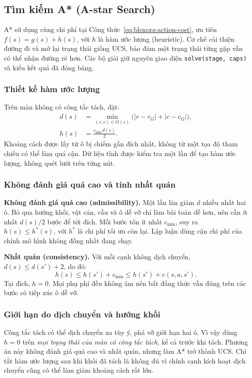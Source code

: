 \subsection{Tìm kiếm A* (A-star Search)}
\label{sec:bloxorz-astar}

A* sử dụng cùng chi phí tại Công thức~\eqref{eq:bloxorz-action-cost}, ưu tiên
$f(s)=g(s)+h(s)$, với $h$ là hàm ước lượng (heuristic). Cơ chế cải thiện đường
đi và mở lại trạng thái giống UCS, bảo đảm một trạng thái từng gặp vẫn có thể
nhận đường rẻ hơn. Các bộ giải giữ nguyên giao diện
\texttt{solve(stage, caps)} và kiểu kết quả đã đóng băng.

\subsubsection{Thiết kế hàm ước lượng}
Trên màn không có công tắc tách, đặt:
\begin{align}
  d(s)&=\min_{(r,c)\in O(s)}\bigl(|r-r_G|+|c-c_G|\bigr),\\
  h(s)&=\frac{c_{\min}\,d(s)}{2}.
  \label{eq:bloxorz-heuristic}
\end{align}
Khoảng cách được lấy từ ô bị chiếm gần đích nhất, không từ một tọa độ tham
chiếu có thể làm quá cận. Dữ liệu tĩnh được kiểm tra một lần để tạo hàm ước
lượng, không quét lưới trên từng nút.

\subsubsection{Không đánh giá quá cao và tính nhất quán}
\textbf{Không đánh giá quá cao (admissibility).}
Một lần lăn giảm $d$ nhiều nhất hai ô. Bỏ qua hướng khối, vật cản, cầu và ô dễ
vỡ chỉ làm bài toán dễ hơn, nên cần ít nhất $d(s)/2$ bước để tới đích. Mỗi bước
tốn ít nhất $c_{\min}$, suy ra $h(s)\leq h^*(s)$, với $h^*$ là chi phí tối ưu
còn lại. Lập luận dùng cận chi phí của chính mô hình không đồng nhất đang chạy.

\textbf{Nhất quán (consistency).}
Với mỗi cạnh không dịch chuyển, $d(s)\leq d(s')+2$, do đó:
\begin{equation}
  h(s)\leq h(s')+c_{\min}\leq h(s')+c(s,a,s').
\end{equation}
Tại đích, $h=0$. Mọi phụ phí đều không âm nên bất đẳng thức vẫn đúng trên
các bước có tiếp xúc ô dễ vỡ.

\subsubsection{Giới hạn do dịch chuyển và hướng khối}
Công tắc tách có thể dịch chuyển xa tùy ý, phá vỡ giới hạn hai ô. Vì vậy dùng
$h=0$ trên \emph{mọi trạng thái của màn có công tắc tách}, kể cả trước khi tách.
Phương án này không đánh giá quá cao và nhất quán, nhưng làm A* trở thành UCS.
Chỉ tắt hàm ước lượng sau khi khối đã tách là không đủ vì chính cạnh kích hoạt
dịch chuyển cũng có thể làm giảm khoảng cách rất lớn.

